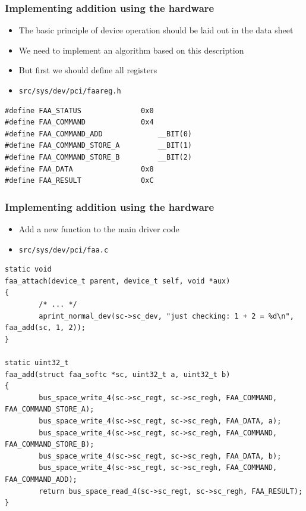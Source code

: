 \documentclass[dvipsnames,table]{beamer}
\begin{document}
\begin{frame}[fragile]
\frametitle{Implementing addition using the hardware}
\begin{itemize}
	\item The basic principle of device operation should be laid out in the data sheet
	\item We need to implement an algorithm based on this description \hyperlink{faaop}{}


	\item But first we should define all registers
	\item {\tt src/sys/dev/pci/faareg.h}
\end{itemize}
\begin{lstlisting}
#define FAA_STATUS              0x0
#define FAA_COMMAND             0x4
#define FAA_COMMAND_ADD             __BIT(0)        
#define FAA_COMMAND_STORE_A         __BIT(1)
#define FAA_COMMAND_STORE_B         __BIT(2)
#define FAA_DATA                0x8
#define FAA_RESULT              0xC
\end{lstlisting}


\end{frame}

\begin{frame}[fragile]
\frametitle{Implementing addition using the hardware}
\begin{itemize}
	\item Add a new function to the main driver code
	\item {\tt src/sys/dev/pci/faa.c}
\end{itemize}
\begin{lstlisting}
static void
faa_attach(device_t parent, device_t self, void *aux)
{
        /* ... */
        aprint_normal_dev(sc->sc_dev, "just checking: 1 + 2 = %d\n", faa_add(sc, 1, 2));
}

static uint32_t
faa_add(struct faa_softc *sc, uint32_t a, uint32_t b)
{
        bus_space_write_4(sc->sc_regt, sc->sc_regh, FAA_COMMAND, FAA_COMMAND_STORE_A);
        bus_space_write_4(sc->sc_regt, sc->sc_regh, FAA_DATA, a);
        bus_space_write_4(sc->sc_regt, sc->sc_regh, FAA_COMMAND, FAA_COMMAND_STORE_B);
        bus_space_write_4(sc->sc_regt, sc->sc_regh, FAA_DATA, b);
        bus_space_write_4(sc->sc_regt, sc->sc_regh, FAA_COMMAND, FAA_COMMAND_ADD);
        return bus_space_read_4(sc->sc_regt, sc->sc_regh, FAA_RESULT);
}
\end{lstlisting}
\end{frame}
\end{document}
